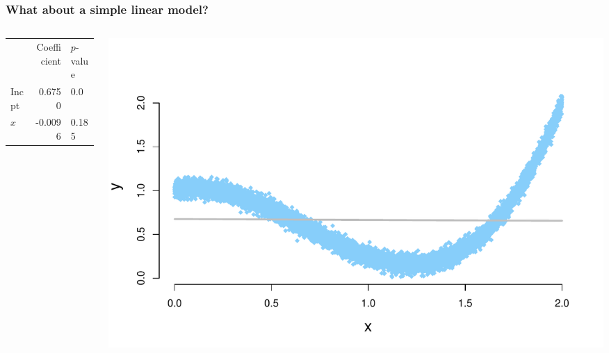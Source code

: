 \documentclass[aspectratio=169]{beamer}
\theoremstyle{principle}
\begin{document}
\begin{frame}
\frametitle{What about a simple \textbf{linear} model?}

\begin{columns}
\begin{column}{0.3\textwidth}

\begin{center}
\begin{tabular}{ lrl } 
\hline
\hline
 & Coefficient & $p$-value\\ 
Incpt & 0.6750 & 0.0\\ 
$x$ & -0.0096 & 0.185 \\ 
\hline
\hline
\end{tabular}
\end{center}

\end{column}
\begin{column}{0.7\textwidth}

\begin{center}
\includegraphics[scale=0.5]{crazy_curve_x.pdf}
\end{center}

\end{column}
\end{columns}

\end{frame}
\end{document}
